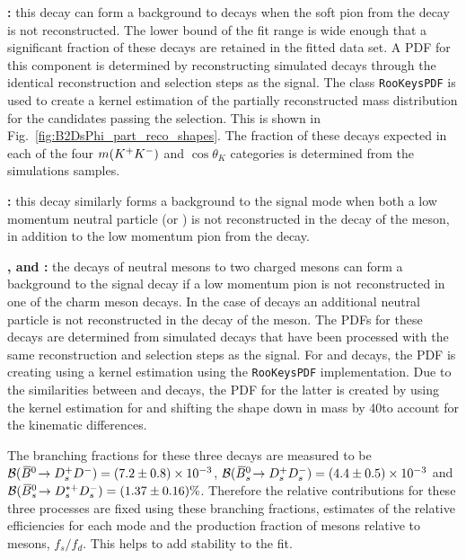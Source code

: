 \begin{description}
\item \textbf{\decay{\Bsb}{\Dsp\Km\Kstarz}:} this decay can form a background to \decay{\Bp}{\Dsp\phiz} decays when the soft pion from the \decay{\Kstarz}{\Kp\pim} decay is not reconstructed. The lower bound of the fit range is wide enough that a significant fraction of these decays are retained in the fitted data set. A PDF for this component is determined by reconstructing simulated \decay{\Bsb}{\Dsp\Km\Kstarz} decays through the identical reconstruction and selection steps as the signal. The \roofit class \texttt{RooKeysPDF} is used to create a kernel estimation of the partially reconstructed \Bp mass distribution for the candidates passing the selection. This is shown in Fig.~\ref{fig:B2DsPhi_part_reco_shapes}. The fraction of these decays expected in each of the four $m({{K}^+}{{K}^-})$ and $\cos\theta_{K}$ categories is determined from the simulations samples.

\item \textbf{\decay{\Bsb}{\Dssp\Km\Kstarz}:} this decay similarly forms a background to the signal mode when both a low momentum neutral particle (\piz or \Pgamma) is not reconstructed in the decay of the \Dssp meson, in addition to the low momentum pion from the \Kstarz decay.

\item \textbf{\decay{\Bsb}{\Dsp\Dsm}, \decay{\Bzb}{\Dsp\Dm} and \decay{\Bsb}{\Dssp\Dsm}:} the decays of neutral \B mesons to two charged \D mesons can form a background to the signal decay if a low momentum pion is not reconstructed in one of the charm meson decays. In the case of \decay{\Bsb}{\Dssp\Dsm} decays an additional neutral particle is not reconstructed in the decay of the \Dssp meson.
The PDFs for these decays are determined from simulated decays that have been processed with the same reconstruction and selection steps as the signal. For \decay{\Bsb}{\Dsp\Dsm} and \decay{\Bsb}{\Dssp\Dsm} decays, the PDF is creating using a kernel estimation using the \roofit \texttt{RooKeysPDF} implementation. Due to the similarities between \decay{\Bsb}{\Dsp\Dsm} and \decay{\Bzb}{\Dsp\Dm} decays, the PDF for the latter is created by using the kernel estimation for \decay{\Bsb}{\Dsp\Dsm} and shifting the shape down in mass by 40\mevcc to account for the kinematic differences. 

The branching fractions for these three decays are measured to be ${\mathcal{B}}({{\kern 0.18em\overline{\kern -0.18em B}{}}{}^0}\!\rightarrow {\ensuremath{{D}^+_{s}}}{\ensuremath{{D}^-}}) = (7.2 \pm 0.8 ) \times 10^{-3}$, ${\mathcal{B}}({{\kern 0.18em\overline{\kern -0.18em B}{}}{}^0_{s}}\!\rightarrow {\ensuremath{{D}^+_{s}}}{\ensuremath{{D}^-_{s}}}) = (4.4 \pm 0.5 ) \times 10^{-3}$ and ${\mathcal{B}}({{\kern 0.18em\overline{\kern -0.18em B}{}}{}^0_{s}}\!\rightarrow {\ensuremath{{D}^{*+}_{s}}}{\ensuremath{{D}^-_{s}}}) = (1.37 \pm 0.16 ) \%$. Therefore the relative contributions for these three processes are fixed using these branching fractions, estimates of the relative efficiencies for each mode and the production fraction of \Bsb mesons relative to \Bzb mesons, $f_{s}/f_{d}$. This helps to add stability to the fit.   
\end{description}


